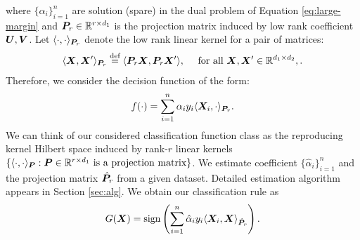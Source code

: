 \documentclass[12pt]{article}
\begin{document}
where $\{\alpha_i\}_{i=1}^n$ are solution  (spare)  in the dual problem of Equation \eqref{eq:large-margin} and $\bm{P}_r\in\mathbb{R}^{r\times d_1}$ is the projection matrix induced by low rank coefficient $\bm{U},\bm{V}$. Let $\langle \cdot,\cdot\rangle_{\bm{P}_r}$ denote the low rank linear kernel for a pair of matrices:
\begin{align}\label{eq:linear kernel}
\langle \bm X,\bm X'\rangle_{\bm{P}_r} \stackrel{\text{def}}{=}\langle \bm{P}_r\bm X,\bm{P}_r\bm X'\rangle, \quad\text{ for all } \bm X,\bm X'\in\mathbb{R}^{d_1\times d_2},.
\end{align}
Therefore, we consider the decision function of the form:
\begin{align}
f(\cdot) = \sum_{i=1}^n \alpha_iy_i\langle\bm X_i,\cdot\rangle_{\bm{P}_r}.
\end{align}
We can think of our considered classification function class as the reproducing kernel Hilbert space induced by rank-$r$ linear kernels $\{\langle \cdot,\cdot\rangle_{\bm{P}}: \bm{P}\in\mathbb{R}^{r\times d_1}\text{ is a projection matrix} \}$.
We estimate coefficient $\{\hat \alpha_i\}_{i=1}^n$ and the projection matrix $\hat {\bm{P}}_r$ from a given dataset. Detailed estimation algorithm appears in Section \ref{sec:alg}. We obtain our classification rule as
\begin{align}
G(\bm X) = \text{sign}\left(\sum_{i=1}^n \hat \alpha_i y_i\langle \bm X_i,\bm X\rangle_{\hat {\bm{P}}_r}\right).
\end{align}
\end{document}
